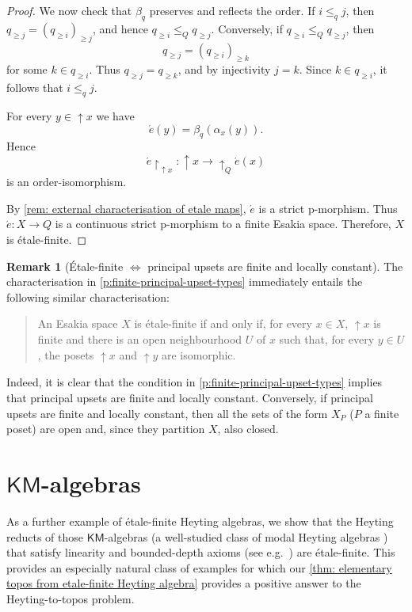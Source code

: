 \documentclass[12pt]{amsart}
\theoremstyle{plain}
\theoremstyle{definition}
\newtheorem{remark}[theorem]{Remark}
\newcommand{\KM}{\mathsf{KM}}
\renewcommand{\u}{{\uparrow}}
\begin{document}
\begin{proof}
    We now check that $\beta_q$ preserves and reflects the order. If $i\leq_q j$, then
    $q_{\geq j}=(q_{\geq i})_{\geq j}$, and hence $q_{\geq i}\leq_Q q_{\geq j}$. Conversely,
    if $q_{\geq i}\leq_Q q_{\geq j}$, then
    \[
        q_{\geq j}=(q_{\geq i})_{\geq k}
    \]
    for some $k\in q_{\geq i}$. Thus $q_{\geq j}=q_{\geq k}$, and by injectivity $j=k$.
    Since $k\in q_{\geq i}$, it follows that $i\leq_q j$.

    For every $y\in{\u}x$ we have
    \[
        \acute{e}(y)=\beta_q(\alpha_x(y)).
    \]
    Hence
    \[
        \acute{e}\!\restriction_{{\u}x}\colon {\u}x\longrightarrow {\u}_Q \acute{e}(x)
    \]
    is an order-isomorphism.

    By \cref{rem: external characterisation of etale maps}, $\acute{e}$ is a strict p-morphism.
    Thus $\acute{e}\colon X\to Q$ is a continuous strict p-morphism to a finite Esakia space.
    Therefore, $X$ is étale-finite.
\end{proof}

\begin{remark}[\'Etale-finite $\Leftrightarrow$ principal upsets are finite and locally constant]
    The characterisation in \cref{p:finite-principal-upset-types} immediately entails the following similar characterisation: 
    \begin{quotation}
        An Esakia space $X$ is étale-finite if and only if, for every $x \in X$, $\u x$ is finite and there is an open neighbourhood $U$ of $x$ such that, for every $y \in U$, the posets $\u x$ and $\u y$ are isomorphic.
    \end{quotation}
    Indeed, it is clear that the condition in \cref{p:finite-principal-upset-types} implies that principal upsets are finite and locally constant.
    Conversely, if principal upsets are finite and locally constant, then all the sets of the form $X_P$ ($P$ a finite poset) are open and, since they partition $X$, also closed.
\end{remark}


\section{\texorpdfstring{$\KM$}{KM}-algebras}\label{sec: a further example}


As a further example of étale-finite Heyting algebras, we show that the Heyting reducts of those $\KM$-algebras (a well-studied class of modal Heyting algebras \cite{Muravitsky2014,Esakia2006}) that satisfy linearity and bounded-depth axioms (see e.g.\ \cite{Litak2014}) are étale-finite. This provides an especially natural class of examples for which our \cref{thm: elementary topos from etale-finite Heyting algebra} provides a positive answer to the Heyting-to-topos problem.
\end{document}
